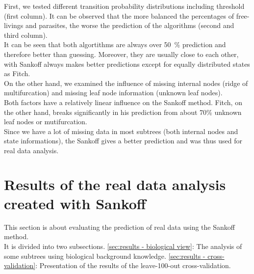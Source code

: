     First, we tested different transition probability distributions including threshold (first column). 
      It can be observed that the more balanced the percentages of free-livings and parasites, the 
      worse the prediction of the algorithms (second and third column). \\
    It can be seen that both algortithms are always over 50~\% prediction and therefore better than 
      guessing. Moreover, they are usually close to each other, with Sankoff always makes better 
      predictions except for equally distributed states as Fitch. \\
    On the other hand, we examined the influence of missing internal nodes (ridge of multifurcation) 
      and missing leaf node information (unknown leaf nodes). \\
    Both factors have a relatively linear influence on the Sankoff method. Fitch, on the other hand, 
      breaks significantly in his prediction from about 70\% unknown leaf nodes or mutifurcation. \\

    Since we have a lot of missing data in most subtrees (both internal nodes and state informations), 
      the Sankoff gives a better prediction and was thus used for real data analysis.

  \section{Results of the real data analysis created with Sankoff}
    This section is about evaluating the prediction of real data using the Sankoff method. \\
    It is divided into two subsections. \ref{sec:results - biological view}: The analysis of some subtrees using 
      biological background knowledge. \ref{sec:results - cross-validation}: Presentation of the results 
      of the leave-100-out cross-validation.

